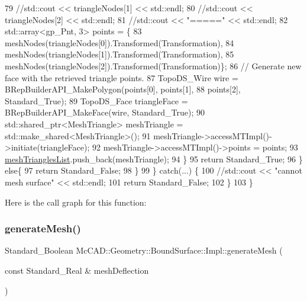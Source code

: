 \begin{DoxyCode}
79               \textcolor{comment}{//std::cout   << triangleNodes[1] << std::endl;}
80               \textcolor{comment}{//std::cout   << triangleNodes[2] << std::endl;}
81               \textcolor{comment}{//std::cout << "=====" << std::endl;}
82               std::array<gp\_Pnt, 3> points = \{
83                   meshNodes(triangleNodes[0]).Transformed(Transformation),
84                   meshNodes(triangleNodes[1]).Transformed(Transformation),
85                   meshNodes(triangleNodes[2]).Transformed(Transformation)\};
86               \textcolor{comment}{// Generate new face with the retrieved triangle points.}
87               TopoDS\_Wire wire = BRepBuilderAPI\_MakePolygon(points[0], points[1],
88                       points[2], Standard\_True);
89               TopoDS\_Face triangleFace = BRepBuilderAPI\_MakeFace(wire, Standard\_True);
90               std::shared\_ptr<MeshTriangle> meshTriangle = std::make\_shared<MeshTriangle>();
91               meshTriangle->accessMTImpl()->initiate(triangleFace);
92               meshTriangle->accessMTImpl()->points = points;
93               \hyperlink{classMcCAD_1_1Geometry_1_1BoundSurface_1_1Impl_a707439343badaddb4fc5590b2c35e4c9}{meshTrianglesList}.push\_back(meshTriangle);
94           \}
95           \textcolor{keywordflow}{return} Standard\_True;
96       \} \textcolor{keywordflow}{else}\{
97           \textcolor{keywordflow}{return} Standard\_False;
98       \}
99   \} \textcolor{keywordflow}{catch}(...) \{
100       \textcolor{comment}{//std::cout << "cannot mesh surface" << std::endl;}
101       \textcolor{keywordflow}{return} Standard\_False;
102   \}
103 \}
\end{DoxyCode}
Here is the call graph for this function\+:
\mbox{\label{classMcCAD_1_1Geometry_1_1BoundSurface_1_1Impl_a3b3d4989cf11d9d13155106dbd5875b2}} 
\subsubsection{\texorpdfstring{generate\+Mesh()}{generateMesh()}\hspace{0.1cm}{\footnotesize\ttfamily [2/2]}}
{\footnotesize\ttfamily Standard\+\_\+\+Boolean Mc\+C\+A\+D\+::\+Geometry\+::\+Bound\+Surface\+::\+Impl\+::generate\+Mesh (\begin{DoxyParamCaption}\item[{const Standard\+\_\+\+Real \&}]{mesh\+Deflection }\end{DoxyParamCaption})}

